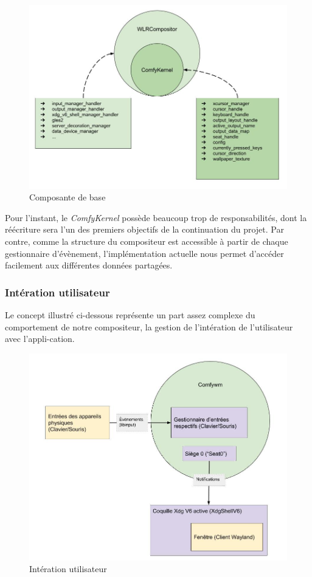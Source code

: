 \documentclass[titlepage]{article}
\begin{document}
\begin{figure}[H]
	\centering
	\includegraphics[width=\textwidth]{architecture_base.jpg}
	\caption{Composante de base}
\end{figure}

\par
Pour l'instant, le \textit{ComfyKernel} possède beaucoup trop de responsabilités, dont la réécriture sera l'un des premiers objectifs de la continuation du projet. Par contre, comme la structure du compositeur est accessible à partir de chaque gestionnaire d'évènement, l'implémentation actuelle nous permet d'accéder facilement aux différentes données partagées.
\bigskip

\subsubsection{Intération utilisateur}
\par
Le concept illustré ci-dessous représente un part assez complexe du comportement de notre compositeur, la gestion de l'intération de l'utilisateur avec l'appli-cation.
\bigskip

\begin{figure}[H]
	\centering
	\includegraphics[width=\textwidth]{interaction_utilisateur.jpg}
	\caption{Intération utilisateur}
\end{figure}
\end{document}
